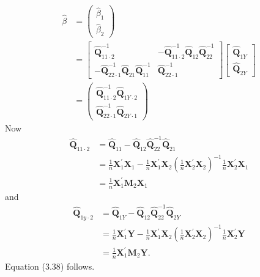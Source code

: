 \documentclass[10pt]{article}
\begin{document}
$$
\begin{aligned}
\widehat{\beta} &=\left(\begin{array}{c}
\widehat{\beta}_{1} \\
\widehat{\beta}_{2}
\end{array}\right) \\
&=\left[\begin{array}{cc}
\widehat{\boldsymbol{Q}}_{11 \cdot 2}^{-1} & -\widehat{\boldsymbol{Q}}_{11 \cdot 2}^{-1} \widehat{\boldsymbol{Q}}_{12} \widehat{\boldsymbol{Q}}_{22}^{-1} \\
-\widehat{\boldsymbol{Q}}_{22 \cdot 1}^{-1} \widehat{\boldsymbol{Q}}_{21} \widehat{\boldsymbol{Q}}_{11}^{-1} & \widehat{\boldsymbol{Q}}_{22 \cdot 1}^{-1}
\end{array}\right]\left[\begin{array}{c}
\widehat{\boldsymbol{Q}}_{1 Y} \\
\widehat{\boldsymbol{Q}}_{2 Y}
\end{array}\right] \\
&=\left(\begin{array}{c}
\widehat{\mathbf{Q}}_{11 \cdot 2}^{-1} \widehat{\boldsymbol{Q}}_{1 Y \cdot 2} \\
\widehat{\mathbf{Q}}_{22 \cdot 1}^{-1} \widehat{\mathbf{Q}}_{2 Y \cdot 1}
\end{array}\right)
\end{aligned}
$$
Now
$$
\begin{aligned}
\widehat{\boldsymbol{Q}}_{11 \cdot 2} &=\widehat{\boldsymbol{Q}}_{11}-\widehat{\boldsymbol{Q}}_{12} \widehat{\boldsymbol{Q}}_{22}^{-1} \widehat{\boldsymbol{Q}}_{21} \\
&=\frac{1}{n} \boldsymbol{X}_{1}^{\prime} \boldsymbol{X}_{1}-\frac{1}{n} \boldsymbol{X}_{1}^{\prime} \boldsymbol{X}_{2}\left(\frac{1}{n} \boldsymbol{X}_{2}^{\prime} \boldsymbol{X}_{2}\right)^{-1} \frac{1}{n} \boldsymbol{X}_{2}^{\prime} \boldsymbol{X}_{1} \\
&=\frac{1}{n} \boldsymbol{X}_{1}^{\prime} \boldsymbol{M}_{2} \boldsymbol{X}_{1}
\end{aligned}
$$
and
$$
\begin{aligned}
\widehat{\boldsymbol{Q}}_{1 y \cdot 2} &=\widehat{\boldsymbol{Q}}_{1 Y}-\widehat{\boldsymbol{Q}}_{12} \widehat{\boldsymbol{Q}}_{22}^{-1} \widehat{\boldsymbol{Q}}_{2 Y} \\
&=\frac{1}{n} \boldsymbol{X}_{1}^{\prime} \boldsymbol{Y}-\frac{1}{n} \boldsymbol{X}_{1}^{\prime} \boldsymbol{X}_{2}\left(\frac{1}{n} \boldsymbol{X}_{2}^{\prime} \boldsymbol{X}_{2}\right)^{-1} \frac{1}{n} \boldsymbol{X}_{2}^{\prime} \boldsymbol{Y} \\
&=\frac{1}{n} \boldsymbol{X}_{1}^{\prime} \boldsymbol{M}_{2} \boldsymbol{Y} .
\end{aligned}
$$
Equation (3.38) follows.
\end{document}
